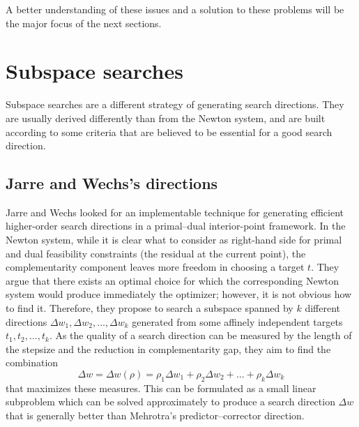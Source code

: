 
A better understanding of these issues and a solution to these
problems will be the major focus of the next sections.


%
%
\section{Subspace searches}

Subspace searches are a different strategy of generating search 
directions. 
They are usually derived differently than from the Newton system, and 
are built according to some criteria that are believed to be essential 
for a good search direction.

%
%
\subsection{Jarre and Wechs's directions}

Jarre and Wechs \cite{JarreWechs} %
looked for an implementable technique for generating efficient 
higher-order search directions in a primal--dual interior-point framework.
In the Newton system, while it is clear what to consider as right-hand 
side for primal and dual feasibility constraints (the residual 
at the current point), the complementarity component leaves more 
freedom in choosing a target $t$. They argue that there exists 
an optimal choice for which the corresponding Newton system would 
produce immediately the optimizer; however, it is not obvious how 
to find it.
Therefore, they propose to search a subspace spanned by $k$ different 
directions $\Delta w_1, \Delta w_2, \ldots, \Delta w_k$ generated 
from some affinely independent targets $t_1,t_2,\ldots,t_k$.
As the quality of a search direction can be measured by the length 
of the stepsize and the reduction in complementarity gap, they aim 
to find the combination 
\[
\Delta w = \Delta w(\rho) 
         = \rho_1\Delta w_1 + \rho_2\Delta w_2 + \ldots + \rho_k\Delta w_k
\]
that maximizes these measures.
This can be formulated as a small linear subproblem which can 
be solved approximately to produce a search direction $\Delta w$ 
that is generally better than Mehrotra's predictor--corrector direction.

